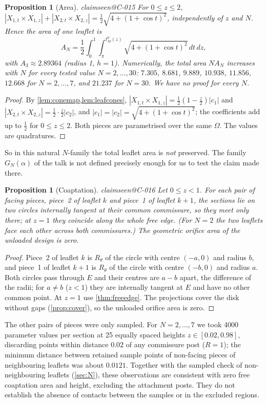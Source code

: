 \documentclass[11pt,a4paper]{article}
\makeatletter
\theoremstyle{plain}
\newtheorem{proposition}[theorem]{Proposition}
\theoremstyle{remark}
\newcommand{\claim}[1]{\ifcsname claimseen@#1\endcsname\else\expandafter\gdef\csname claimseen@#1\endcsname{}\label{claim:#1}\fi}
\makeatother
\begin{document}
\begin{proposition}[Area]\label{prop:area}\claim{C-015}
For $0\le z\le2$, $|X_{1,t}\times X_{1,z}|+|X_{2,t}\times X_{2,z}|=\tfrac12\sqrt{4+(1+\cos t)^2}$, independently of $z$ and
$N$. Hence the area of one leaflet is
\[ A_N=\frac12\int_0^1\!\!\int_\pi^{t^\theta_M(z)}\sqrt{4+(1+\cos t)^2}\,dt\,dz, \]
with $A_3\approx2.89364$ (radius 1, $h=1$). Numerically, the total area $N A_N$ increases with $N$ for every tested value
$N=2,\dots,30$: $7.305$, $8.681$, $9.889$, $10.938$, $11.856$, $12.668$ for $N=2,\dots,7$, and $21.237$ for $N=30$. We have no
proof for every $N$.
\end{proposition}
\begin{proof}
By \cref{lem:conemap,lem:leafcones}, $|X_{1,t}\times X_{1,z}|=\frac12(1-\frac z2)|c_1|$ and
$|X_{2,t}\times X_{2,z}|=\frac12\cdot\frac z2|c_2|$, and $|c_1|=|c_2|=\sqrt{4+(1+\cos t)^2}$; the coefficients add up to
$\frac12$ for $0\le z\le2$. Both pieces are parametrised over the same $\Omega$. The values are quadratures.
\end{proof}

So in this natural $N$-family the total leaflet area is \emph{not} preserved. The family $G_N(\alpha)$ of the talk is not
defined precisely enough for us to test the claim made there.

\begin{proposition}[Coaptation]\label{prop:coapt}\claim{C-016}
Let $0\le z<1$. For each pair of facing pieces, piece~2 of leaflet $k$ and piece~1 of leaflet $k+1$, the sections lie on two
circles internally tangent at their common commissure, so they meet only there; at $z=1$ they coincide along the whole free
edge. (For $N=2$ the two leaflets face each other across both commissures.) The geometric orifice area of the unloaded
design is zero.
\end{proposition}
\begin{proof}
Piece~2 of leaflet $k$ is $R_\theta$ of the circle with centre $(-a,0)$ and radius $b$, and piece~1 of leaflet $k+1$ is
$R_\theta$ of the circle with centre $(-b,0)$ and radius $a$. Both circles pass through $E$ and their centres are $a-b$ apart,
the difference of the radii; for $a\ne b$ ($z<1$) they are internally tangent at $E$ and have no other common point. At
$z=1$ use \cref{thm:freeedge}. The projections cover the disk without gaps (\cref{prop:cover}), so the unloaded orifice area
is zero.
\end{proof}
The other pairs of pieces were only sampled. For $N=2,\dots,7$ we took 4000 parameter values per section at 25 equally
spaced heights $z\in[0.02,0.98]$, discarding points within distance $0.02$ of any commissure post ($R=1$); the minimum distance
between retained sample points of non-facing pieces of neighbouring leaflets was about $0.0121$. Together with the sampled
check of non-neighbouring leaflets (\cref{sec:N}), these observations are consistent with zero free coaptation area and height,
excluding the attachment posts. They do not establish the absence of contacts between the samples or in the excluded
regions.
\end{document}
